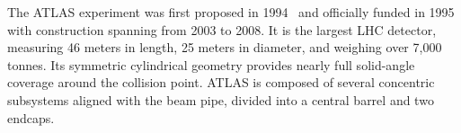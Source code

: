 


The ATLAS experiment was first proposed in 1994~\cite{atlas_technical_proposal} and officially funded in 1995 with construction spanning from 2003 to 2008. It is the largest LHC detector, measuring 46 meters in length, 25 meters in diameter, and weighing over 7,000 tonnes. Its symmetric cylindrical geometry provides nearly full solid-angle coverage around the collision point. ATLAS is composed of several concentric subsystems aligned with the beam pipe, divided into a central barrel and two endcaps.

